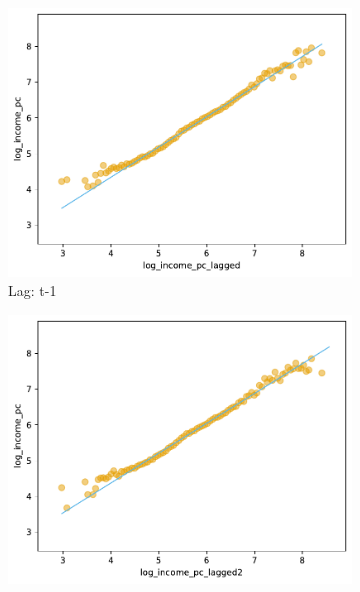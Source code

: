 


\begin{figure}[H]
    \caption{Correlation of log(Income) with Lagged Conglomerate Log Income}
    \centering
         \centering
         \begin{subfigure}[b]{0.47\textwidth}
             \centering
             \includegraphics[width=\textwidth]{../figures/figA_income_vs_lagged_income_log_log_scatterplot.pdf}
             \caption{Lag: t-1}
         \end{subfigure}
         \hfill
         \begin{subfigure}[b]{0.47\textwidth}
             \centering
             \includegraphics[width=\textwidth]{../figures/figA_income_vs_lagged2_income_log_log_scatterplot.pdf}

\end{subfigure}
\end{figure}
